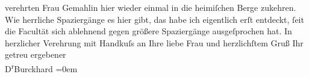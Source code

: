 \begin{ledgroupsized}[t]{13cm}
               verehrten Frau Gemahlin hier
               wieder einmal in die heimiſchen Berge zukehren. Wie herrliche Spaziergänge es hier
               gibt, das habe ich eigentlich erſt entdeckt, ſeit die Facultät sich ablehnend gegen
               größere Spaziergänge ausgeſprochen hat.\pend
           \pstart
           {\pb}In herzlicher Verehrung mit Handkuſs an
               Ihre liebe Frau und
               herzlichſtem Gruß\pend
           \pstart
           Ihr getreu ergebener{\\[\baselineskip]}\spacefill\mbox{D\textsuperscript{r}Burckhard}\pend
           \leftskip=0em{}
         
         \endnumbering{}\end{ledgroupsized}  \newcommand{\dateiname}{L01783}\newcommand{\titel}{Max Burckhard an Arthur Schnitzler, 14. 7. 1908}\newcommand{\editorInnen}{Martin Anton Müller und Gerd-Hermann Susen}
      